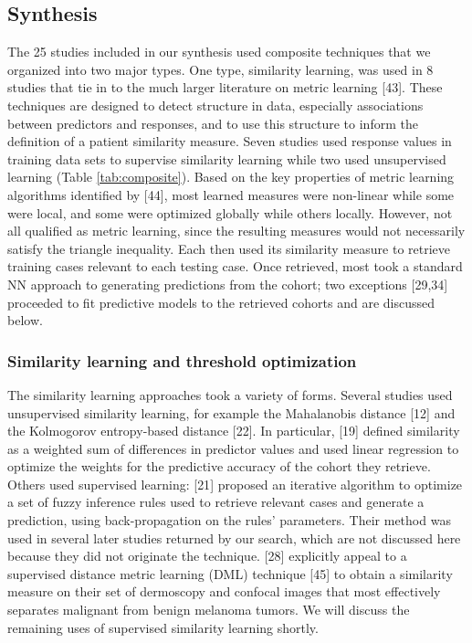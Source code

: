 \documentclass[preprint, 3p,
authoryear]{elsarticle} %
\begin{document}
\hypertarget{synthesis-1}{%
\subsection{Synthesis}\label{synthesis-1}}

The 25 studies included in our synthesis used composite techniques that
we organized into two major types. One type, similarity learning, was
used in 8 studies that tie in to the much larger literature on metric
learning {[}43{]}. These techniques are designed to detect structure in
data, especially associations between predictors and responses, and to
use this structure to inform the definition of a patient similarity
measure. Seven studies used response values in training data sets to
supervise similarity learning while two used unsupervised learning
(Table \ref{tab:composite}). Based on the key properties of metric
learning algorithms identified by {[}44{]}, most learned measures were
non-linear while some were local, and some were optimized globally while
others locally. However, not all qualified as metric learning, since the
resulting measures would not necessarily satisfy the triangle
inequality. Each then used its similarity measure to retrieve training
cases relevant to each testing case. Once retrieved, most took a
standard NN approach to generating predictions from the cohort; two
exceptions {[}29,34{]} proceeded to fit predictive models to the
retrieved cohorts and are discussed below.

\hypertarget{similarity-learning-and-threshold-optimization}{%
\subsubsection{Similarity learning and threshold
optimization}\label{similarity-learning-and-threshold-optimization}}

The similarity learning approaches took a variety of forms. Several
studies used unsupervised similarity learning, for example the
Mahalanobis distance {[}12{]} and the Kolmogorov entropy-based distance
{[}22{]}. In particular, {[}19{]} defined similarity as a weighted sum
of differences in predictor values and used linear regression to
optimize the weights for the predictive accuracy of the cohort they
retrieve. Others used supervised learning: {[}21{]} proposed an
iterative algorithm to optimize a set of fuzzy inference rules used to
retrieve relevant cases and generate a prediction, using
back-propagation on the rules' parameters. Their method was used in
several later studies returned by our search, which are not discussed
here because they did not originate the technique. {[}28{]} explicitly
appeal to a supervised distance metric learning (DML) technique {[}45{]}
to obtain a similarity measure on their set of dermoscopy and confocal
images that most effectively separates malignant from benign melanoma
tumors. We will discuss the remaining uses of supervised similarity
learning shortly.
\end{document}
